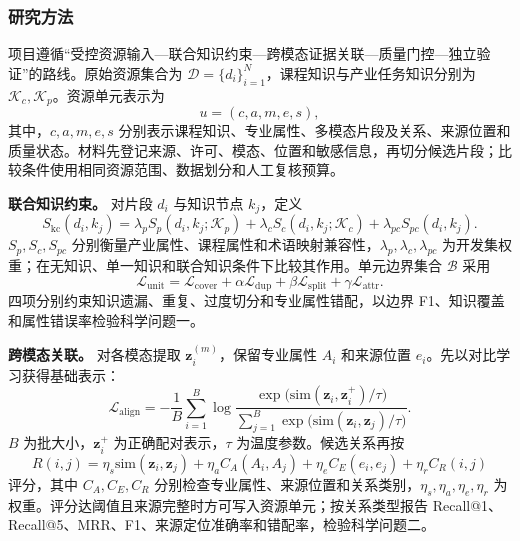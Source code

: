 \justifying
\NSFCBodyText

\subsubsection{研究方法}

项目遵循“受控资源输入—联合知识约束—跨模态证据关联—质量门控—独立验证”的路线。原始资源集合为 \(\mathcal{D}=\{d_i\}_{i=1}^{N}\)，课程知识与产业任务知识分别为 \(\mathcal{K}_c,\mathcal{K}_p\)。资源单元表示为
\begin{equation}
u=(c,a,m,e,s),
\end{equation}
其中，\(c,a,m,e,s\) 分别表示课程知识、专业属性、多模态片段及关系、来源位置和质量状态。材料先登记来源、许可、模态、位置和敏感信息，再切分候选片段；比较条件使用相同资源范围、数据划分和人工复核预算。

\textbf{联合知识约束。} 对片段 \(d_i\) 与知识节点 \(k_j\)，定义
\begin{equation}
S_{\mathrm{kc}}(d_i,k_j)=
\lambda_p S_p(d_i,k_j;\mathcal{K}_p)+
\lambda_c S_c(d_i,k_j;\mathcal{K}_c)+
\lambda_{pc}S_{pc}(d_i,k_j).
\end{equation}
\(S_p,S_c,S_{pc}\) 分别衡量产业属性、课程属性和术语映射兼容性，\(\lambda_p,\lambda_c,\lambda_{pc}\) 为开发集权重；在无知识、单一知识和联合知识条件下比较其作用。单元边界集合 \(\mathcal{B}\) 采用
\begin{equation}
\mathcal{L}_{\mathrm{unit}}=
\mathcal{L}_{\mathrm{cover}}+
\alpha\mathcal{L}_{\mathrm{dup}}+
\beta\mathcal{L}_{\mathrm{split}}+
\gamma\mathcal{L}_{\mathrm{attr}}.
\end{equation}
四项分别约束知识遗漏、重复、过度切分和专业属性错配，以边界 F1、知识覆盖和属性错误率检验科学问题一。

\textbf{跨模态关联。} 对各模态提取 \(\boldsymbol{z}_i^{(m)}\)，保留专业属性 \(A_i\) 和来源位置 \(e_i\)。先以对比学习获得基础表示：
\begin{equation}
\mathcal{L}_{\mathrm{align}}=
-\frac{1}{B}\sum_{i=1}^{B}
\log\frac{\exp\bigl(\mathrm{sim}(\boldsymbol{z}_i,\boldsymbol{z}_i^{+})/\tau\bigr)}
{\sum_{j=1}^{B}\exp\bigl(\mathrm{sim}(\boldsymbol{z}_i,\boldsymbol{z}_j)/\tau\bigr)}.
\end{equation}
\(B\) 为批大小，\(\boldsymbol{z}_i^{+}\) 为正确配对表示，\(\tau\) 为温度参数。候选关系再按
\begin{equation}
R(i,j)=\eta_s\mathrm{sim}(\boldsymbol{z}_i,\boldsymbol{z}_j)
+\eta_a C_A(A_i,A_j)+\eta_e C_E(e_i,e_j)+\eta_r C_R(i,j)
\end{equation}
评分，其中 \(C_A,C_E,C_R\) 分别检查专业属性、来源位置和关系类别，\(\eta_s,\eta_a,\eta_e,\eta_r\) 为权重。评分达阈值且来源完整时方可写入资源单元；按关系类型报告 Recall@1、Recall@5、MRR、F1、来源定位准确率和错配率，检验科学问题二。

